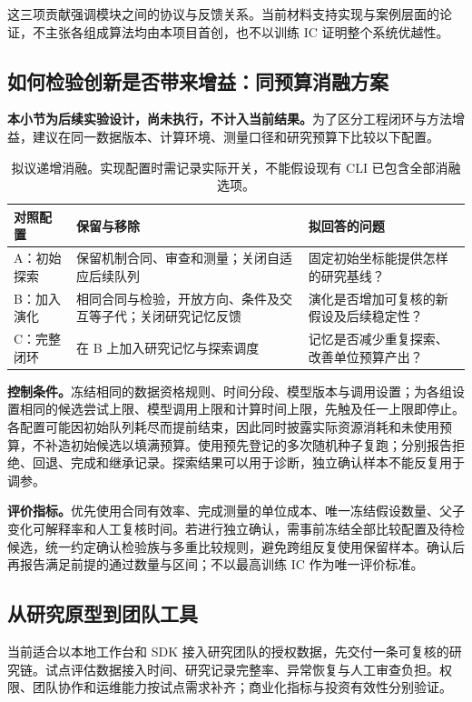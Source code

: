 \vspace{0.5em}
这三项贡献强调模块之间的协议与反馈关系。当前材料支持实现与案例层面的论证，不主张各组成算法均由本项目首创，也不以训练 IC 证明整个系统优越性。

\clearpage
\subsection{如何检验创新是否带来增益：同预算消融方案}
\textcolor{aurorablue}{\textbf{本小节为后续实验设计，尚未执行，不计入当前结果。}}为了区分工程闭环与方法增益，建议在同一数据版本、计算环境、测量口径和研究预算下比较以下配置。

\begin{table}[ht]
\centering\small
\begin{tabularx}{\textwidth}{@{}p{}XX@{}}
\toprule
\textbf{对照配置} & \textbf{保留与移除} & \textbf{拟回答的问题}\\
\midrule
A：初始探索 & 保留机制合同、审查和测量；关闭自适应后续队列 & 固定初始坐标能提供怎样的研究基线？\\
B：加入演化 & 相同合同与检验，开放方向、条件及交互等子代；关闭研究记忆反馈 & 演化是否增加可复核的新假设及后续稳定性？\\
C：完整闭环 & 在 B 上加入研究记忆与探索调度 & 记忆是否减少重复探索、改善单位预算产出？\\
\bottomrule
\end{tabularx}
\caption{拟议递增消融。实现配置时需记录实际开关，不能假设现有 CLI 已包含全部消融选项。}
\end{table}

\textbf{控制条件。}冻结相同的数据资格规则、时间分段、模型版本与调用设置；为各组设置相同的候选尝试上限、模型调用上限和计算时间上限，先触及任一上限即停止。各配置可能因初始队列耗尽而提前结束，因此同时披露实际资源消耗和未使用预算，不补造初始候选以填满预算。使用预先登记的多次随机种子复跑；分别报告拒绝、回退、完成和继承记录。探索结果可以用于诊断，独立确认样本不能反复用于调参。

\textbf{评价指标。}优先使用合同有效率、完成测量的单位成本、唯一冻结假设数量、父子变化可解释率和人工复核时间。若进行独立确认，需事前冻结全部比较配置及待检候选，统一约定确认检验族与多重比较规则，避免跨组反复使用保留样本。确认后再报告满足前提的通过数量与区间；不以最高训练 IC 作为唯一评价标准。

\begin{center}
\setlength{\fboxsep}{9pt}
\end{center}

\subsection{从研究原型到团队工具}
当前适合以本地工作台和 SDK 接入研究团队的授权数据，先交付一条可复核的研究链。试点评估数据接入时间、研究记录完整率、异常恢复与人工审查负担。权限、团队协作和运维能力按试点需求补齐；商业化指标与投资有效性分别验证。
\clearpage
